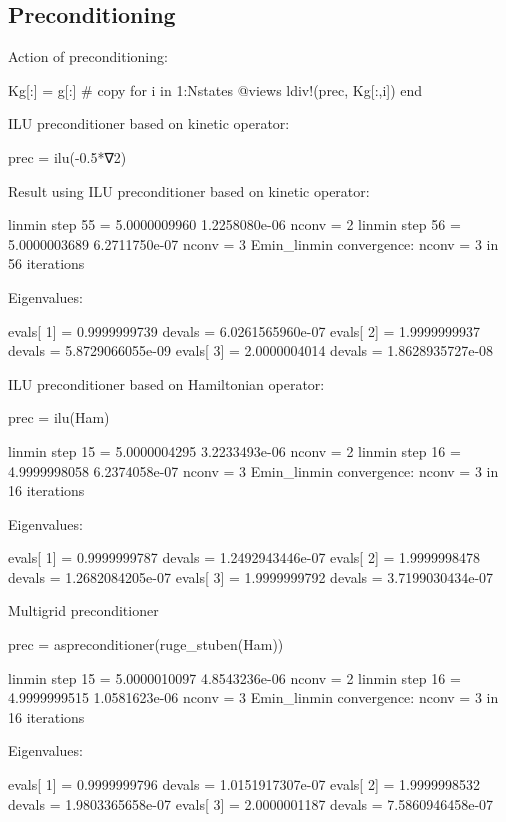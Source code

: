 \subsection{Preconditioning}

Action of preconditioning:

\begin{juliacode}
Kg[:] = g[:] # copy
for i in 1:Nstates
    @views ldiv!(prec, Kg[:,i])
end
\end{juliacode}

ILU preconditioner based on kinetic operator:
\begin{juliacode}
prec = ilu(-0.5*∇2)
\end{juliacode}

Result using ILU preconditioner based on kinetic operator:
\begin{textcode}
linmin step       55 =       5.0000009960   1.2258080e-06  nconv =     2
linmin step       56 =       5.0000003689   6.2711750e-07  nconv =     3
Emin_linmin convergence: nconv =     3 in    56 iterations

Eigenvalues:

evals[  1] =       0.9999999739 devals =   6.0261565960e-07
evals[  2] =       1.9999999937 devals =   5.8729066055e-09
evals[  3] =       2.0000004014 devals =   1.8628935727e-08  
\end{textcode}

ILU preconditioner based on Hamiltonian operator:
\begin{juliacode}
prec = ilu(Ham)
\end{juliacode}

\begin{textcode}
linmin step       15 =       5.0000004295   3.2233493e-06  nconv =     2
linmin step       16 =       4.9999998058   6.2374058e-07  nconv =     3
Emin_linmin convergence: nconv =     3 in    16 iterations
  
Eigenvalues:
  
evals[  1] =       0.9999999787 devals =   1.2492943446e-07
evals[  2] =       1.9999998478 devals =   1.2682084205e-07
evals[  3] =       1.9999999792 devals =   3.7199030434e-07
\end{textcode}


Multigrid preconditioner
\begin{juliacode}
prec = aspreconditioner(ruge_stuben(Ham))
\end{juliacode}

\begin{textcode}
linmin step       15 =       5.0000010097   4.8543236e-06  nconv =     2
linmin step       16 =       4.9999999515   1.0581623e-06  nconv =     3
Emin_linmin convergence: nconv =     3 in    16 iterations

Eigenvalues:

evals[  1] =       0.9999999796 devals =   1.0151917307e-07
evals[  2] =       1.9999998532 devals =   1.9803365658e-07
evals[  3] =       2.0000001187 devals =   7.5860946458e-07
\end{textcode}


